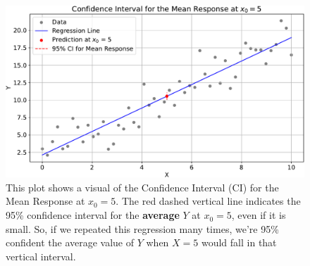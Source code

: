 \begin{figure}[!htp]
    \centering
    \includegraphics[width=\textwidth]{img/linear-regression/ci-for-mean-response.pdf}
    \caption{This plot shows a visual of the Confidence Interval (CI) for the Mean Response at $x_0 = 5$. The red dashed vertical line indicates the 95\% confidence interval for the \textbf{average} $Y$ at $x_0 = 5$, even if it is small. So, if we repeated this regression many times, we're 95\% confident the average value of $Y$ when $X = 5$ would fall in that vertical interval.}
    \label{fig: Confidence Interval for the Mean Response}
\end{figure}
